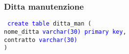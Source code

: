 \documentclass{article}
\begin{document}
    \subsubsection{Ditta manutenzione}
    \begin{flushleft}
        \texttt{
        \textcolor{blue}{create table} ditta\_man ( \\
        \hspace*{2em} nome\_ditta \hspace*{2em} \textcolor{blue}{varchar(30)} \hspace*{4em} \textcolor{blue}{primary key}, \\
        \hspace*{2em} contratto \hspace*{2.3em} \textcolor{blue}{varchar(30)} \\)}
    \end{flushleft}
\end{document}

